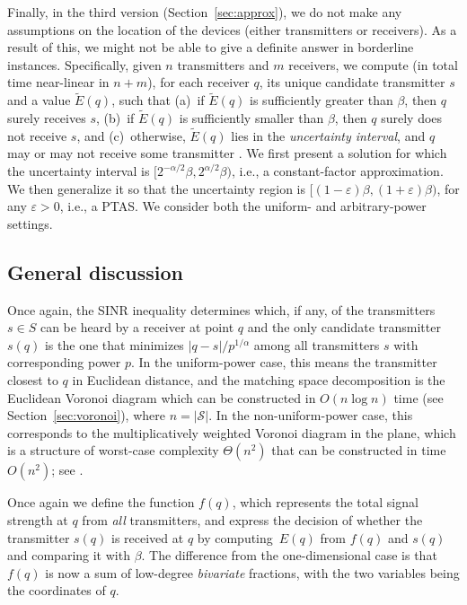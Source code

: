 \documentclass[11pt]{article}
\theoremstyle{remark}
\def\S{\mathcal{S}}
\def\EE{\tilde{E}}
\let\eps\varepsilon
\begin{document}
Finally, in the third version (Section~\ref{sec:approx}), we do not make any assumptions on the location of the devices (either transmitters or receivers). As a result of this, we might not be able to give a definite answer in borderline instances. Specifically, given $n$ transmitters and $m$ receivers, we compute (in total time near-linear in $n+m$), for each receiver $q$, its unique candidate transmitter $s$ and a value $\EE(q)$, such that (a)~if $\EE(q)$ is sufficiently greater than $\beta$, then $q$ surely receives $s$, (b)~if $\EE(q)$ is sufficiently smaller than $\beta$, then $q$ surely does not receive $s$, and (c)~otherwise, $\EE(q)$ lies in the \emph{uncertainty interval}, and $q$ may or may not receive some transmitter . 
We first present a solution for which the uncertainty interval is $[2^{-\alpha/2}\beta,2^{\alpha/2}\beta)$, i.e., a constant-factor approximation. We then generalize it so that the uncertainty region is $[(1-\eps)\beta,(1+\eps)\beta)$, for any $\eps > 0$, i.e., a PTAS.
We consider both the uniform- and arbitrary-power settings.

 
\subsection{General discussion}
Once again, the SINR inequality determines which, if any, of the transmitters 
$s \in S$ can be heard by a receiver at point $q$ and the only
candidate transmitter $s(q)$ is the one that minimizes
$|q-s|/p^{1/\alpha}$ among all transmitters $s$ with corresponding
power $p$.  In the uniform-power case, this means the transmitter
closest to $q$ in Euclidean distance, and the matching space
decomposition is the Euclidean Voronoi diagram which can be
constructed in $O(n \log n)$ time (see Section~\ref{sec:voronoi}),
where $n=|\S|$.  In the non-uniform-power case, this corresponds to
the multiplicatively weighted Voronoi diagram in the plane, which is a
structure of worst-case complexity $\Theta(n^2)$ that can be
constructed in time $O(n^2)$; see \cite{ae-oacwvdp-84}.

Once again we define the function $f(q)$, which represents the total signal strength
at $q$ from \emph{all} transmitters, and express the decision of whether
the transmitter $s(q)$ is received at $q$ by computing~$E(q)$ from $f(q)$ and $s(q)$ and comparing
it with $\beta$.  The difference from the one-dimensional case is that
$f(q)$ is now a sum of low-degree \emph{bivariate} fractions, with
the two variables being the coordinates of $q$. 
\end{document}
